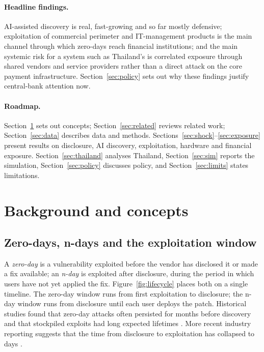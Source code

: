\documentclass[11pt,a4paper]{article}
\begin{document}
\paragraph{Headline findings.} AI-assisted discovery is real, fast-growing and so far mostly defensive; exploitation of commercial perimeter and IT-management products is the main channel through which zero-days reach financial institutions; and the main systemic risk for a system such as Thailand's is correlated exposure through shared vendors and service providers rather than a direct attack on the core payment infrastructure. Section~\ref{sec:policy} sets out why these findings justify central-bank attention now.

\paragraph{Roadmap.} Section~\ref{sec:background} sets out concepts; Section~\ref{sec:related} reviews related work; Section~\ref{sec:data} describes data and methods. Sections~\ref{sec:shock}--\ref{sec:exposure} present results on disclosure, AI discovery, exploitation, hardware and financial exposure. Section~\ref{sec:thailand} analyses Thailand, Section~\ref{sec:sim} reports the simulation, Section~\ref{sec:policy} discusses policy, and Section~\ref{sec:limits} states limitations.

\section{Background and concepts}\label{sec:background}

\subsection{Zero-days, n-days and the exploitation window}
A \emph{zero-day} is a vulnerability exploited before the vendor has disclosed it or made a fix available; an \emph{n-day} is exploited after disclosure, during the period in which users have not yet applied the fix. Figure~\ref{fig:lifecycle} places both on a single timeline. The zero-day window runs from first exploitation to disclosure; the n-day window runs from disclosure until each user deploys the patch. Historical studies found that zero-day attacks often persisted for months before discovery \citep{bilge2012before} and that stockpiled exploits had long expected lifetimes \citep{ablon2017zero}. More recent industry reporting suggests that the time from disclosure to exploitation has collapsed to days \citep{mandiant2024tte}.
\end{document}
